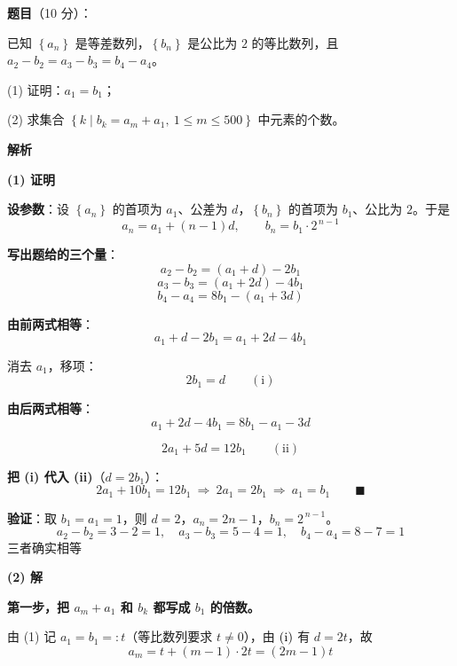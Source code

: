 \begin{answer}

\textbf{题目}（10 分）：

已知 $\left\{a_n\right\}$ 是等差数列，$\left\{b_n\right\}$ 是公比为 $2$ 的等比数列，且 $a_2-b_2=a_3-b_3=b_4-a_4$。

  (1) 证明：$a_1=b_1$；

  (2) 求集合 $\left\{k\mid b_k=a_m+a_1,\ 1\le m\le500\right\}$ 中元素的个数。

\textbf{解析}

\par\medskip

\textbf{(1) 证明}

\textbf{设参数}：设 $\left\{a_n\right\}$ 的首项为 $a_1$、公差为 $d$，$\left\{b_n\right\}$ 的首项为 $b_1$、公比为 $2$。于是
\nopagebreak[4]
\[a_n=a_1+(n-1)d,\qquad b_n=b_1\cdot2^{\,n-1}\]

\textbf{写出题给的三个量}：
\nopagebreak[4]
\[a_2-b_2=\left(a_1+d\right)-2b_1\]
\nopagebreak[4]
\[a_3-b_3=\left(a_1+2d\right)-4b_1\]
\nopagebreak[4]
\[b_4-a_4=8b_1-\left(a_1+3d\right)\]

\textbf{由前两式相等}：
\nopagebreak[4]
\[a_1+d-2b_1=a_1+2d-4b_1\]

消去 $a_1$，移项：
\nopagebreak[4]
\[2b_1=d\qquad(\text{i})\]

\textbf{由后两式相等}：
\nopagebreak[4]
\[a_1+2d-4b_1=8b_1-a_1-3d\]

\nopagebreak[4]
\[2a_1+5d=12b_1\qquad(\text{ii})\]

\textbf{把 (i) 代入 (ii)}（$d=2b_1$）：
\nopagebreak[4]
\[2a_1+10b_1=12b_1\ \Longrightarrow\ 2a_1=2b_1\ \Longrightarrow\ a_1=b_1\qquad\blacksquare\]

\textbf{验证}：取 $b_1=a_1=1$，则 $d=2$，$a_n=2n-1$，$b_n=2^{\,n-1}$。
\nopagebreak[4]
\[a_2-b_2=3-2=1,\quad a_3-b_3=5-4=1,\quad b_4-a_4=8-7=1\]
三者确实相等 

\par\medskip

\textbf{(2) 解}

\textbf{第一步，把 $a_m+a_1$ 和 $b_k$ 都写成 $b_1$ 的倍数。}

由 (1) 记 $a_1=b_1=:t$（等比数列要求 $t\ne0$），由 $(\text i)$ 有 $d=2t$，故
\nopagebreak[4]
\[a_m=t+(m-1)\cdot2t=(2m-1)t\]


\end{answer}
